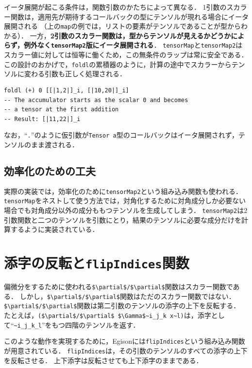 イータ展開が起こる条件は，関数引数のかたちによって異なる．
1引数のスカラー関数は，適用先が期待するコールバックの型にテンソルが現れる場合にイータ展開される
（上の\lstinline{map}の例では，リストの要素がテンソルであることが型からわかる）．
一方，\textbf{2引数のスカラー関数は，型からテンソルが見えるかどうかによらず，例外なく\lstinline{tensorMap2}版にイータ展開される}．
\lstinline{tensorMap}と\lstinline{tensorMap2}はスカラー値に対しては恒等に働くため，この無条件のラップは常に安全である．
この設計のおかげで，\lstinline{foldl}の累積器のように，計算の途中でスカラーからテンソルに変わる引数も正しく処理される．
\begin{lstlisting}[language=egison,numbers=none]
foldl (+) 0 [[|1,2|]_i, [|10,20|]_i]
-- The accumulator starts as the scalar 0 and becomes
-- a tensor at the first addition
-- Result: [|11,22|]_i
\end{lstlisting}
なお，``\lstinline{.}''のように仮引数が\lstinline{Tensor a}型のコールバックはイータ展開されず，テンソルのまま渡される．

\subsection{効率化のための工夫}

実際の実装では，効率化のために\lstinline{tensorMap2}という組み込み関数も使われる．
\lstinline{tensorMap}をネストして使う方法では，対角化するために対角成分しか必要ない場合でも対角成分以外の成分ももつテンソルを生成してしまう．
\lstinline{tensorMap2}は$2$引数関数と二つのテンソルを引数にとり，結果のテンソルに必要な成分だけを計算するように実装されている．

\section{添字の反転と\texttt{flipIndices}関数}

偏微分をするために使われる\lstinline[mathescape]!$\partial$/$\partial$!関数はスカラー関数である．
しかし，\lstinline[mathescape]!$\partial$/$\partial$!関数はただのスカラー関数ではない．
\lstinline[mathescape]!$\partial$/$\partial$!関数は第二引数のテンソルの添字の上下を反転する．
たとえば，\lstinline[mathescape]|($\partial$/$\partial$ $\Gamma$~i_j_k x~l)|は，添字として``\lstinline|~i_j_k_l|''をもつ四階のテンソルを返す．

このような動作を実現するために，Egisonには\lstinline{flipIndices}という組み込み関数が用意されている．
\lstinline{flipIndices}は，その引数のテンソルのすべての添字の上下を反転させる．
上下添字は反転させても上下添字のままである．

